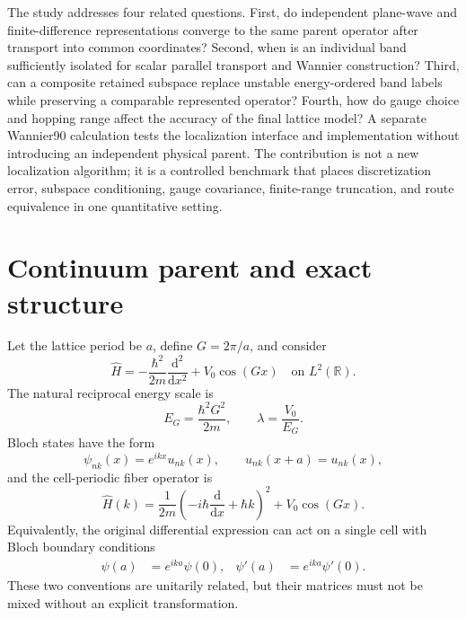 The study addresses four related questions. First, do independent
plane-wave and finite-difference representations converge to the same parent
operator after transport into common coordinates? Second, when is an individual
band sufficiently isolated for scalar parallel transport and Wannier
construction? Third, can a composite retained subspace replace unstable
energy-ordered band labels while preserving a comparable represented operator?
Fourth, how do gauge choice and hopping range affect the accuracy of the final
lattice model? A separate Wannier90 calculation tests the localization
interface and implementation without introducing an independent physical
parent. The contribution is not a new localization algorithm; it is a
controlled benchmark that places discretization error, subspace conditioning,
gauge covariance, finite-range truncation, and route equivalence in one
quantitative setting.

\section{Continuum parent and exact structure}

Let the lattice period be $a$, define $G=2\pi/a$, and consider
\begin{equation}
    \hat H
    =
    -\frac{\hbar^2}{2m}
    \frac{\mathrm{d}^2}{\mathrm{d}x^2}
    +V_0\cos(Gx)
    \quad\text{on }L^2(\mathbb R).
    \label{eq:periodic-1d-parent}
\end{equation}
The natural reciprocal energy scale is
\begin{equation}
    E_G=\frac{\hbar^2G^2}{2m},
    \qquad
    \lambda=\frac{V_0}{E_G}.
    \label{eq:periodic-1d-scales}
\end{equation}
Bloch states have the form
\begin{equation}
    \psi_{nk}(x)=e^{ikx}u_{nk}(x),
    \qquad
    u_{nk}(x+a)=u_{nk}(x),
\end{equation}
and the cell-periodic fiber operator is
\begin{equation}
    \hat H(k)
    =
    \frac{1}{2m}
    \left(-i\hbar\frac{\mathrm{d}}{\mathrm{d}x}+\hbar k\right)^2
    +V_0\cos(Gx).
    \label{eq:periodic-1d-fiber}
\end{equation}
Equivalently, the original differential expression can act on a single cell
with Bloch boundary conditions
\begin{align}
    \psi(a)&=e^{ika}\psi(0),
    &
    \psi'(a)&=e^{ika}\psi'(0).
\end{align}
These two conventions are unitarily related, but their matrices must not be
mixed without an explicit transformation.

